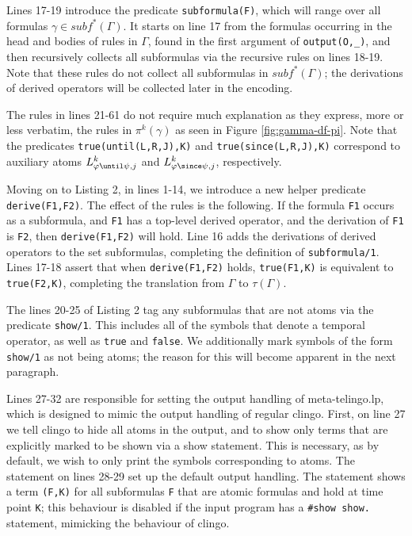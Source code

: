Lines 17-19 introduce the predicate \verb|subformula(F)|, which will
range over all formulas $\gamma \in subf^*(\Gamma)$. It starts on line
17 from the formulas occurring in the head and bodies of rules in
$\Gamma$, found in the first argument of \verb|output(O,_)|, and then
recursively collects all subformulas via the recursive rules on lines
18-19. Note that these rules do not collect all subformulas in
$subf^*(\Gamma)$; the derivations of derived operators will be
collected later in the encoding.

The rules in lines 21-61 do not require much explanation as they
express, more or less verbatim, the rules in $\pi^k(\gamma)$ as seen
in Figure \ref{fig:gamma-df-pi}. Note that the predicates
\verb|true(until(L,R,J),K)| and \verb|true(since(L,R,J),K)| correspond
to auxiliary atoms $L^k_{\varphi \until \psi,j}$ and
$L^k_{\varphi \since \psi,j}$, respectively.

Moving on to Listing 2, in lines 1-14, we introduce a new helper
predicate \verb|derive(F1,F2)|. The effect of the rules is the
following. If the formula \verb|F1| occurs as a subformula, and
\verb|F1| has a top-level derived operator, and the derivation of
\verb|F1| is \verb|F2|, then \verb|derive(F1,F2)| will hold. Line 16
adds the derivations of derived operators to the set subformulas,
completing the definition of \verb|subformula/1|. Lines 17-18 assert
that when \verb|derive(F1,F2)| holds, \verb|true(F1,K)| is equivalent
to \verb|true(F2,K)|, completing the translation from $\Gamma$ to
$\tau(\Gamma)$.

The lines 20-25 of Listing 2 tag any subformulas that are not atoms
via the predicate \verb|show/1|. This includes all of the symbols that
denote a temporal operator, as well as \verb|true| and
\verb|false|. We additionally mark symbols of the form \verb|show/1|
as not being atoms; the reason for this will become apparent in the
next paragraph.

Lines 27-32 are responsible for setting the output handling of
meta-telingo.lp, which is designed to mimic the output handling of
regular clingo. First, on line 27 we tell clingo to hide all atoms in
the output, and to show only terms that are explicitly marked to be
shown via a show statement. This is necessary, as by default, we wish
to only print the symbols corresponding to atoms. The statement on
lines 28-29 set up the default output handling. The statement shows a
term \verb|(F,K)| for all subformulas \verb|F| that are atomic
formulas and hold at time point \verb|K|; this behaviour is disabled
if the input program has a \verb|#show show.| statement, mimicking the
behaviour of clingo. 

